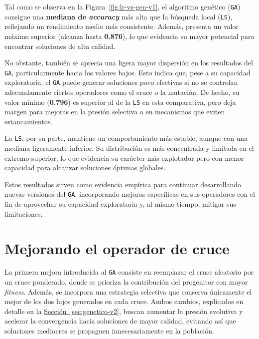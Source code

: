 Tal como se observa en la Figura~\ref{fig:lr-vs-gen-v1}, el algoritmo genético (\texttt{GA}) consigue una \textbf{mediana de \textit{accuracy}} más alta que la búsqueda local (\texttt{LS}),
reflejando un rendimiento medio más consistente.
Además, presenta un valor máximo superior (alcanza hasta \textbf{0.876}), lo que evidencia su mayor potencial para encontrar soluciones de alta calidad.

No obstante, también se aprecia una ligera mayor dispersión en los resultados del \texttt{GA}, particularmente hacia los valores bajos.
Esto indica que, pese a su capacidad exploratoria, el \texttt{GA} puede generar soluciones poco efectivas si no se controlan adecuadamente ciertos operadores como el cruce o la mutación.
De hecho, su valor mínimo (\textbf{0.796}) es superior al de la \texttt{LS} en esta comparativa,
pero deja margen para mejoras en la presión selectiva o en mecanismos que eviten estancamientos.

La \texttt{LS}, por su parte, mantiene un comportamiento más estable, aunque con una mediana ligeramente inferior.
Su distribución es más concentrada y limitada en el extremo superior, lo que evidencia su carácter más explotador pero con menor capacidad para alcanzar soluciones óptimas globales.

Estos resultados sirven como evidencia empírica para continuar desarrollando nuevas versiones del \texttt{GA},
incorporando mejoras específicas en sus operadores con el fin de aprovechar su capacidad exploratoria y, al mismo tiempo, mitigar sus limitaciones.

\section{Mejorando el operador de cruce}\label{sec:incorporacion-cruce}
La primera mejora introducida al \texttt{GA} consiste en reemplazar el cruce aleatorio por un cruce ponderado,
donde se prioriza la contribución del progenitor con mayor \textit{fitness}.
Además, se incorpora una estrategia selectiva que conserva únicamente el mejor de los dos hijos generados en cada cruce.
Ambos cambios, explicados en detalle en la \hyperref[sec:genetico-v2]{Sección~\ref*{sec:genetico-v2}},
buscan aumentar la presión evolutiva y acelerar la convergencia hacia soluciones de mayor calidad,
evitando así que soluciones mediocres se propaguen innecesariamente en la población.

